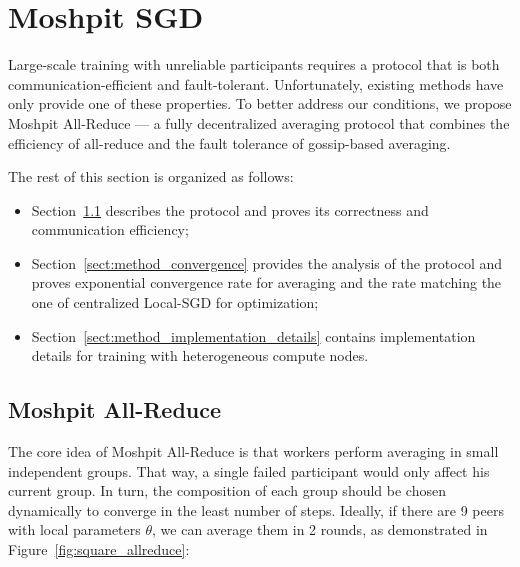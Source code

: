 \section{Moshpit SGD}\label{sect:method}


Large-scale training with unreliable participants requires a protocol that is both communication-efficient and fault-tolerant. Unfortunately, existing methods have only  provide one of these properties. To better address our conditions, we propose Moshpit All-Reduce --- a fully decentralized averaging protocol that combines the efficiency of all-reduce and the fault tolerance of gossip-based averaging. 

The rest of this section is organized as follows:
\begin{itemize}
    \item Section~\ref{sect:method_algorithm} describes the protocol and proves its correctness and communication efficiency;
    \item Section~\ref{sect:method_convergence} provides the analysis of the protocol and proves exponential convergence rate for averaging and the rate matching the one of centralized Local-SGD for optimization;
    \item Section~\ref{sect:method_implementation_details} contains implementation details for training with heterogeneous compute nodes.
\end{itemize}

\subsection{Moshpit All-Reduce}
\label{sect:method_algorithm}

The core idea of Moshpit All-Reduce is that workers perform averaging in small independent groups. That way, a single failed participant would only affect his current group. In turn, the composition of each group should be chosen dynamically to converge in the least number of steps.
Ideally, if there are 9 peers with local parameters $\theta$, we can average them in 2 rounds, as demonstrated in Figure~\ref{fig:square_allreduce}:

